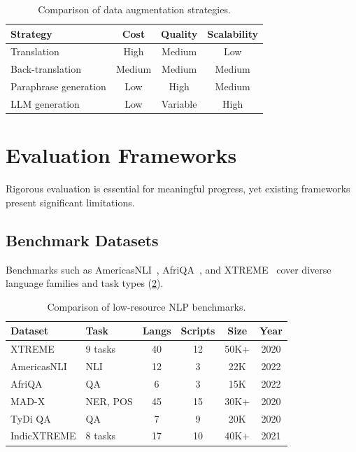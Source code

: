 \documentclass[
    language=english,
    doctype=article,
    institution=none,
    titlestyle=book,
]{../../omnilatex}
\begin{document}
\begin{table}[htbp]
\centering
\caption{Comparison of data augmentation strategies.}
\label{tab:augmentation-compare}
\begin{tabular}{lccc}
\toprule
\textbf{Strategy} & \textbf{Cost} & \textbf{Quality} & \textbf{Scalability} \\
\midrule
Translation          & High  & Medium  & Low  \\
Back-translation     & Medium& Medium  & Medium\\
Paraphrase generation& Low   & High    & Medium\\
LLM generation       & Low   & Variable& High \\
\bottomrule
\end{tabular}
\end{table}

\section{Evaluation Frameworks}
\label{sec:evaluation}
Rigorous evaluation is essential for meaningful progress, yet existing
frameworks present significant limitations.

\subsection{Benchmark Datasets}
Benchmarks such as AmericasNLI~\cite{eberle2022americasnli},
AfriQA~\cite{odegbami2022afrimqa}, and XTREME~\cite{hu2020xtreme} cover
diverse language families and task types (\cref{tab:benchmarks}).

\begin{table}[htbp]
\centering
\caption{Comparison of low-resource NLP benchmarks.}
\label{tab:benchmarks}
\begin{tabular}{llcccc}
\toprule
\textbf{Dataset} & \textbf{Task} & \textbf{Langs} & \textbf{Scripts}
    & \textbf{Size} & \textbf{Year} \\
\midrule
XTREME       & 9 tasks  & 40  & 12  & 50K+  & 2020 \\
AmericasNLI  & NLI      & 12  & 3   & 22K   & 2022 \\
AfriQA       & QA       & 6   & 3   & 15K   & 2022 \\
MAD-X        & NER, POS & 45  & 15  & 30K+  & 2020 \\
TyDi QA      & QA       & 7   & 9   & 20K   & 2020 \\
IndicXTREME  & 8 tasks  & 17  & 10  & 40K+  & 2021 \\
\bottomrule
\end{tabular}
\end{table}
\end{document}
